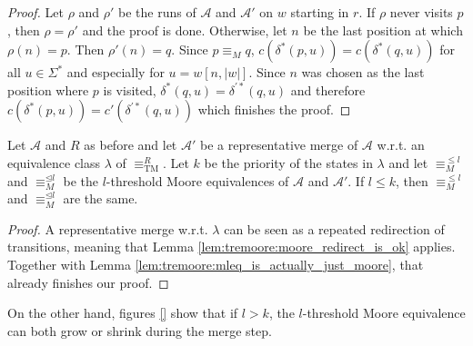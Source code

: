 \begin{proof}
	Let $\rho$ and $\rho'$ be the runs of $\mathcal{A}$ and $\mathcal{A}'$ on $w$ starting in $r$. If $\rho$ never visits $p$, then $\rho = \rho'$ and the proof is done. Otherwise, let $n$ be the last position at which $\rho(n) = p$. Then $\rho'(n) = q$. Since $p \equiv_M q$, $c(\delta^*(p, u)) = c(\delta^*(q, u))$ for all $u \in \Sigma^*$ and especially for $u = w[n, |w|]$. Since $n$ was chosen as the last position where $p$ is visited, $\delta^*(q, u) = \delta^{\prime *}(q, u)$ and therefore $c(\delta^*(p, u)) = c'(\delta^{\prime *}(q, u))$ which finishes the proof.
\end{proof}

\begin{lem}
	Let $\mathcal{A}$ and $R$ as before and let $\mathcal{A}'$ be a representative merge of $\mathcal{A}$ w.r.t. an equivalence class $\lambda$ of $\equiv_\text{TM}^R$. Let $k$ be the priority of the states in $\lambda$ and let $\equiv_M^{\leq l}$ and $\equiv_M^{\unlhd l}$ be the $l$-threshold Moore equivalences of $\mathcal{A}$ and $\mathcal{A}'$. If $l \leq k$, then $\equiv_M^{\leq l}$ and $\equiv_M^{\unlhd l}$ are the same.
\end{lem}

\begin{proof}
	A representative merge w.r.t. $\lambda$ can be seen as a repeated redirection of transitions, meaning that Lemma \ref{lem:tremoore:moore_redirect_is_ok} applies. Together with Lemma \ref{lem:tremoore:mleq_is_actually_just_moore}, that already finishes our proof.
\end{proof}

On the other hand, figures \ref{} show that if $l > k$, the $l$-threshold Moore equivalence can both grow or shrink during the merge step. %




















